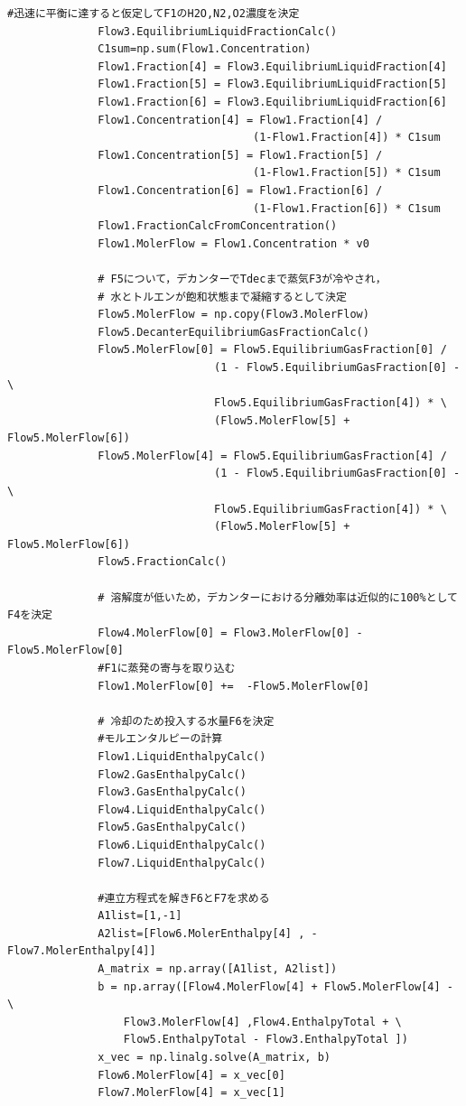 \documentclass[a4j]{jsreport}
\begin{document}
\begin{lstlisting}[caption=気液反応器の解析(迅速に平衡)]
              #迅速に平衡に達すると仮定してF1のH2O,N2,O2濃度を決定
              Flow3.EquilibriumLiquidFractionCalc()
              C1sum=np.sum(Flow1.Concentration)
              Flow1.Fraction[4] = Flow3.EquilibriumLiquidFraction[4]
              Flow1.Fraction[5] = Flow3.EquilibriumLiquidFraction[5]
              Flow1.Fraction[6] = Flow3.EquilibriumLiquidFraction[6]
              Flow1.Concentration[4] = Flow1.Fraction[4] /
                                      (1-Flow1.Fraction[4]) * C1sum
              Flow1.Concentration[5] = Flow1.Fraction[5] /
                                      (1-Flow1.Fraction[5]) * C1sum
              Flow1.Concentration[6] = Flow1.Fraction[6] /
                                      (1-Flow1.Fraction[6]) * C1sum
              Flow1.FractionCalcFromConcentration()
              Flow1.MolerFlow = Flow1.Concentration * v0

              # F5について，デカンターでTdecまで蒸気F3が冷やされ，
              # 水とトルエンが飽和状態まで凝縮するとして決定
              Flow5.MolerFlow = np.copy(Flow3.MolerFlow)
              Flow5.DecanterEquilibriumGasFractionCalc()
              Flow5.MolerFlow[0] = Flow5.EquilibriumGasFraction[0] /
                                (1 - Flow5.EquilibriumGasFraction[0] - \
                                Flow5.EquilibriumGasFraction[4]) * \
                                (Flow5.MolerFlow[5] + Flow5.MolerFlow[6])
              Flow5.MolerFlow[4] = Flow5.EquilibriumGasFraction[4] /
                                (1 - Flow5.EquilibriumGasFraction[0] - \
                                Flow5.EquilibriumGasFraction[4]) * \
                                (Flow5.MolerFlow[5] + Flow5.MolerFlow[6])
              Flow5.FractionCalc()

              # 溶解度が低いため，デカンターにおける分離効率は近似的に100%としてF4を決定
              Flow4.MolerFlow[0] = Flow3.MolerFlow[0] - Flow5.MolerFlow[0]
              #F1に蒸発の寄与を取り込む
              Flow1.MolerFlow[0] +=  -Flow5.MolerFlow[0]

              # 冷却のため投入する水量F6を決定
              #モルエンタルピーの計算
              Flow1.LiquidEnthalpyCalc()
              Flow2.GasEnthalpyCalc()
              Flow3.GasEnthalpyCalc()
              Flow4.LiquidEnthalpyCalc()
              Flow5.GasEnthalpyCalc()
              Flow6.LiquidEnthalpyCalc()
              Flow7.LiquidEnthalpyCalc()

              #連立方程式を解きF6とF7を求める
              A1list=[1,-1]
              A2list=[Flow6.MolerEnthalpy[4] , -Flow7.MolerEnthalpy[4]]
              A_matrix = np.array([A1list, A2list])
              b = np.array([Flow4.MolerFlow[4] + Flow5.MolerFlow[4] - \
                  Flow3.MolerFlow[4] ,Flow4.EnthalpyTotal + \
                  Flow5.EnthalpyTotal - Flow3.EnthalpyTotal ])
              x_vec = np.linalg.solve(A_matrix, b)
              Flow6.MolerFlow[4] = x_vec[0]
              Flow7.MolerFlow[4] = x_vec[1]



\end{lstlisting}
\end{document}
